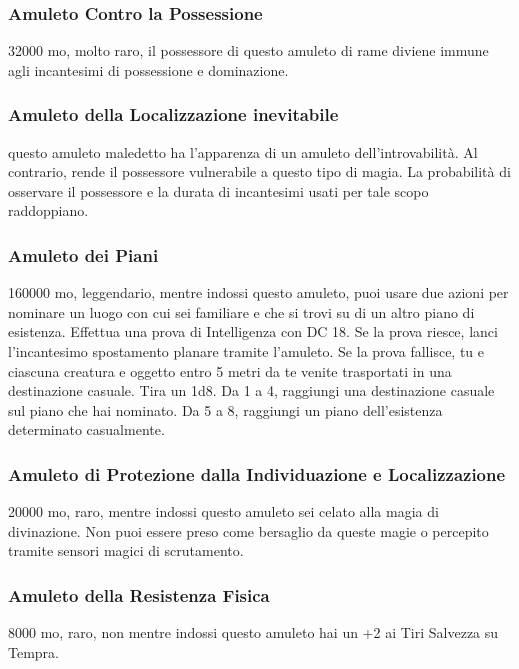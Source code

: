\begin{multicols}{2}
	\subsubsection*{Amuleto Contro la Possessione}
	32000 mo, molto raro, il possessore di questo amuleto di rame diviene immune agli incantesimi di possessione e dominazione.

	\subsubsection*{Amuleto della Localizzazione inevitabile}
	questo amuleto maledetto ha l'apparenza di un amuleto dell'introvabilità. Al contrario, rende il possessore vulnerabile a questo tipo di magia. La probabilità di osservare il possessore e la durata di incantesimi usati per tale scopo raddoppiano.

	\subsubsection*{Amuleto dei Piani}
	160000 mo, leggendario, mentre indossi questo amuleto, puoi usare due azioni per nominare un luogo con cui sei familiare e che si trovi su di un altro piano di esistenza. Effettua una prova di Intelligenza con DC 18. Se la prova riesce, lanci l'incantesimo spostamento planare tramite l'amuleto. Se la prova fallisce, tu e ciascuna creatura e oggetto entro 5 metri da te venite trasportati in una destinazione casuale. Tira un 1d8. Da 1 a 4, raggiungi una destinazione casuale sul piano che hai nominato. Da 5 a 8, raggiungi un piano dell'esistenza determinato casualmente.

	\subsubsection*{Amuleto di Protezione dalla Individuazione e Localizzazione}
	20000 mo, raro, mentre indossi questo amuleto sei celato alla magia di divinazione. Non puoi essere preso come bersaglio da queste magie o percepito tramite sensori magici di scrutamento.

	\subsubsection*{Amuleto della Resistenza Fisica}
	8000 mo, raro, non mentre indossi questo amuleto hai un +2 ai Tiri Salvezza su Tempra.


\end{multicols}
